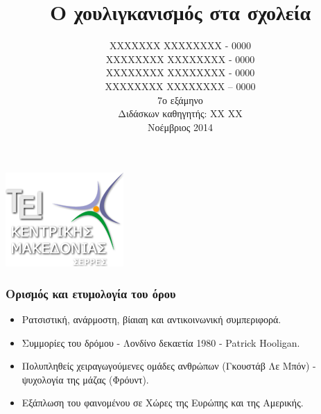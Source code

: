 \documentclass[hyperref={pdfpagelabels=false}, t]{beamer}
\title{Ο χουλιγκανισμός στα σχολεία}
\author[Παιδαγωγικά]{XXXXXXX XXXXXXXX - 0000 \\ XXXXXXXX
XXXXXXXX  - 0000 \\ XXXXXXXX XXXXXXXX - 0000 \\ XXXXXXXX XXXXXXXX – 0000
\vspace{5.5pt} \\ 7ο εξάμηνο \\ Διδάσκων καθηγητής: XX XX
\\Νοέμβριος 2014 }
\date{}
\let\olditem=\item%
\renewcommand{\item}{\olditem \justifying}%
\begin{document}
\begin{frame}[t]
\vspace{1.5pt}
\centering\includegraphics[scale=0.5]{logo}
\vspace{5.5pt}
\titlepage
\end{frame} 


%
%

\begin{frame}[fragile,t]%
    \begin{minipage}[t]{0.99\textwidth}
\frametitle{Ορισμός και ετυμολογία του όρου}
\vspace{-18.5pt} %

\begin{adjustwidth}{-0.7cm}{} %
\justifying
\begin{itemize} %
\item Ρατσιστική, ανάρμοστη, βίαιαη και
αντικοινωνική συμπεριφορά.\setlength{\itemsep}{15pt}
\item Συμμορίες του δρόμου - Λονδίνο δεκαετία
1980 - Patrick Hooligan. \setlength{\itemsep}{15pt}
\item Πολυπληθείς χειραγωγούμενες ομάδες ανθρώπων (Γκουστάβ Λε Μπόν) - ψυχολογία
της μάζας (Φρόυντ). \setlength{\itemsep}{15pt}
\item\setlength{\itemsep}{15pt}Εξάπλωση του φαινομένου σε Χώρες της Ευρώπης και
της Αμερικής.
\end{itemize}
\end{adjustwidth}
\end{minipage}
\end{frame}
\end{document}
